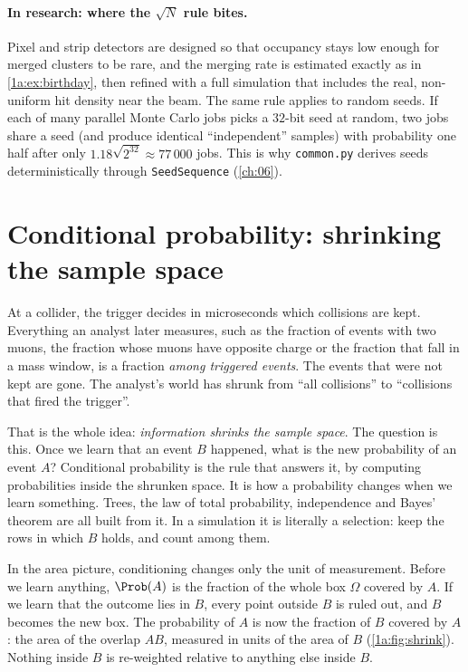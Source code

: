 \paragraph{In research: where the $\sqrt N$ rule bites.}
Pixel and strip detectors are designed so that occupancy stays low enough for
merged clusters to be rare, and the merging rate is estimated exactly as in
\cref{1a:ex:birthday}, then refined with a full simulation that includes the
real, non-uniform hit density near the beam. The same rule applies to random
seeds. If each of many parallel Monte Carlo jobs picks a $32$-bit seed at
random, two jobs share a seed (and produce identical ``independent'' samples)
with probability one half after only $1.18\sqrt{2^{32}}\approx77\,000$ jobs.
This is why \texttt{common.py} derives seeds deterministically through
\texttt{SeedSequence} (\cref{ch:06}).

\section{Conditional probability: shrinking the sample space}
\label{1a:sec:conditional}

At a collider, the trigger decides in microseconds which collisions are kept.
Everything an analyst later measures, such as the fraction of events with two
muons, the fraction whose muons have opposite charge or the fraction that fall
in a mass window, is a fraction \emph{among triggered events}. The events that
were not kept are gone. The analyst's world has shrunk from ``all collisions''
to ``collisions that fired the trigger''.

That is the whole idea: \emph{information shrinks the sample space}. The
question is this. Once we learn that an event $B$ happened, what is the new
probability of an event $A$? Conditional probability is the rule that answers
it, by computing probabilities inside the shrunken space. It is how a
probability changes when we learn something. Trees, the law of total
probability, independence and Bayes' theorem are all built from it. In a
simulation it is literally a selection: keep the rows in which $B$ holds, and
count among them.

In the area picture, conditioning changes only the unit of measurement.
Before we learn anything, $\Prob(A)$ is the fraction of the whole box $\Omega$
covered by $A$. If we learn that the outcome lies in $B$, every point outside
$B$ is ruled out, and $B$ becomes the new box. The probability of $A$ is now the
fraction of $B$ covered by $A$: the area of the overlap $AB$, measured in units
of the area of $B$ (\cref{1a:fig:shrink}). Nothing inside $B$ is re-weighted
relative to anything else inside $B$.

